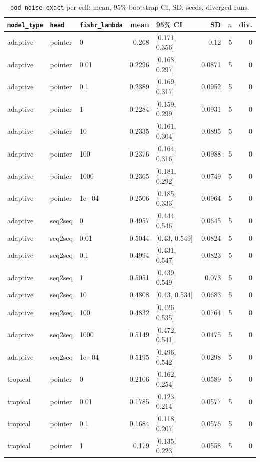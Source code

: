 \documentclass[10pt]{article}
\begin{document}
{\small
\begin{longtable}{lllrlrrr}
\caption{\texttt{ood\_noise\_exact} per cell: mean, 95\% bootstrap CI, SD, seeds, diverged runs.}\label{tab:summary-ood_noise_exact}\\
\toprule
\texttt{model\_type} & \texttt{head} & \texttt{fishr\_lambda} & mean & 95\% CI & SD & $n$ & div.\\
\midrule
\endhead
adaptive & pointer & 0 & 0.268 & [0.171, 0.356] & 0.12 & 5 & 0\\
adaptive & pointer & 0.01 & 0.2296 & [0.168, 0.297] & 0.0871 & 5 & 0\\
adaptive & pointer & 0.1 & 0.2389 & [0.169, 0.317] & 0.0952 & 5 & 0\\
adaptive & pointer & 1 & 0.2284 & [0.159, 0.299] & 0.0931 & 5 & 0\\
adaptive & pointer & 10 & 0.2335 & [0.161, 0.304] & 0.0895 & 5 & 0\\
adaptive & pointer & 100 & 0.2376 & [0.164, 0.316] & 0.0988 & 5 & 0\\
adaptive & pointer & 1000 & 0.2365 & [0.181, 0.292] & 0.0749 & 5 & 0\\
adaptive & pointer & 1e+04 & 0.2506 & [0.185, 0.333] & 0.0964 & 5 & 0\\
adaptive & seq2seq & 0 & 0.4957 & [0.444, 0.546] & 0.0645 & 5 & 0\\
adaptive & seq2seq & 0.01 & 0.5044 & [0.43, 0.549] & 0.0824 & 5 & 0\\
adaptive & seq2seq & 0.1 & 0.4994 & [0.431, 0.547] & 0.0823 & 5 & 0\\
adaptive & seq2seq & 1 & 0.5051 & [0.439, 0.549] & 0.073 & 5 & 0\\
adaptive & seq2seq & 10 & 0.4808 & [0.43, 0.534] & 0.0683 & 5 & 0\\
adaptive & seq2seq & 100 & 0.4832 & [0.426, 0.535] & 0.0764 & 5 & 0\\
adaptive & seq2seq & 1000 & 0.5149 & [0.472, 0.541] & 0.0475 & 5 & 0\\
adaptive & seq2seq & 1e+04 & 0.5195 & [0.496, 0.542] & 0.0298 & 5 & 0\\
tropical & pointer & 0 & 0.2106 & [0.162, 0.254] & 0.0589 & 5 & 0\\
tropical & pointer & 0.01 & 0.1785 & [0.123, 0.214] & 0.0577 & 5 & 0\\
tropical & pointer & 0.1 & 0.1684 & [0.118, 0.207] & 0.0576 & 5 & 0\\
tropical & pointer & 1 & 0.179 & [0.135, 0.223] & 0.0558 & 5 & 0\\

\end{longtable}}
\end{document}
